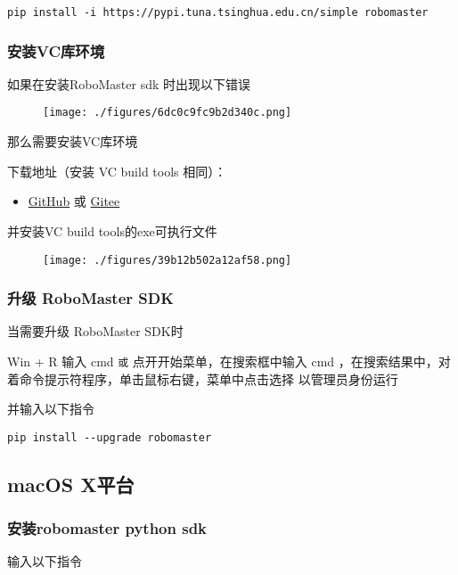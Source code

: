 \begin{lstlisting}[language=pythonC]
pip install -i https://pypi.tuna.tsinghua.edu.cn/simple robomaster
\end{lstlisting}

\subsubsection{安装VC库环境}
如果在安装RoboMaster sdk 时出现以下错误\begin{figure}[ht]
\centering
\texttt{[image: ./figures/6dc0c9fc9b2d340c.png]}
\caption{} \label{fig_PyRM1_2}
\end{figure}
那么需要安装VC库环境

下载地址（安装 VC build tools 相同）：\begin{itemize}
\item \href{https://github.com/dji-sdk/robomaster-sdk}{GitHub} 或 \href{https://gitee.com/xitinglin/RoboMaster-SDK}{Gitee}
\end{itemize}

并安装VC build tools的exe可执行文件

\begin{figure}[ht]
\centering
\texttt{[image: ./figures/39b12b502a12af58.png]}
\caption{} \label{fig_PyRM1_3}
\end{figure}

\subsubsection{升级 RoboMaster SDK}
当需要升级 RoboMaster SDK时

Win + R 输入 cmd 
\verb|或|
点开开始菜单，在搜索框中输入 cmd ，在搜索结果中，对着命令提示符程序，单击鼠标右键，菜单中点击选择 以管理员身份运行 

并输入以下指令

\begin{lstlisting}[language=pythonC]
pip install --upgrade robomaster
\end{lstlisting}

\subsection{macOS X平台}\label{sub_PyRM1_2}
\subsubsection{安装robomaster python sdk}

输入以下指令

